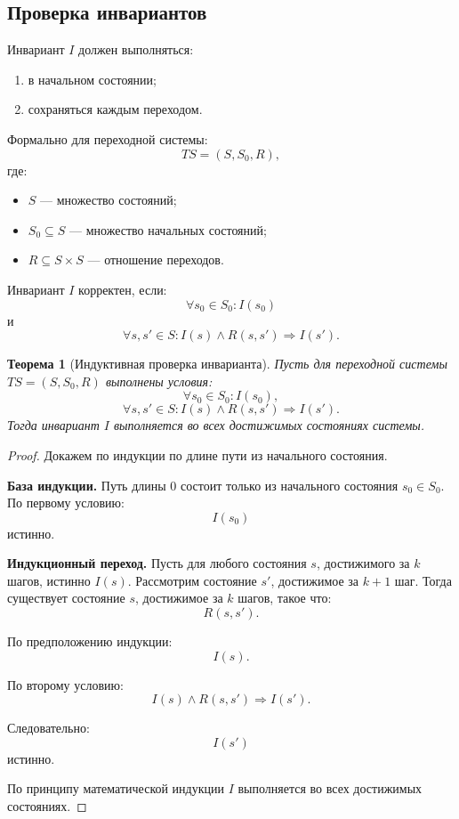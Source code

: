 \documentclass[12pt,a4paper]{article}
\newtheorem{theorem}{Теорема}
\begin{document}
\subsection{Проверка инвариантов}

Инвариант $I$ должен выполняться:
\begin{enumerate}
    \item в начальном состоянии;
    \item сохраняться каждым переходом.
\end{enumerate}

Формально для переходной системы:
\[
    TS = (S, S_0, R),
\]
где:
\begin{itemize}
    \item $S$ --- множество состояний;
    \item $S_0 \subseteq S$ --- множество начальных состояний;
    \item $R \subseteq S \times S$ --- отношение переходов.
\end{itemize}

Инвариант $I$ корректен, если:
\[
    \forall s_0 \in S_0: I(s_0)
\]
и
\[
    \forall s,s' \in S: I(s) \land R(s,s') \Rightarrow I(s').
\]

\begin{theorem}[Индуктивная проверка инварианта]
Пусть для переходной системы $TS=(S,S_0,R)$ выполнены условия:
\[
    \forall s_0 \in S_0: I(s_0),
\]
\[
    \forall s,s' \in S: I(s) \land R(s,s') \Rightarrow I(s').
\]
Тогда инвариант $I$ выполняется во всех достижимых состояниях системы.
\end{theorem}

\begin{proof}
Докажем по индукции по длине пути из начального состояния.

\textbf{База индукции.}
Путь длины $0$ состоит только из начального состояния $s_0 \in S_0$.
По первому условию:
\[
    I(s_0)
\]
истинно.

\textbf{Индукционный переход.}
Пусть для любого состояния $s$, достижимого за $k$ шагов, истинно $I(s)$.
Рассмотрим состояние $s'$, достижимое за $k+1$ шаг.
Тогда существует состояние $s$, достижимое за $k$ шагов, такое что:
\[
    R(s,s').
\]

По предположению индукции:
\[
    I(s).
\]

По второму условию:
\[
    I(s) \land R(s,s') \Rightarrow I(s').
\]

Следовательно:
\[
    I(s')
\]
истинно.

По принципу математической индукции $I$ выполняется во всех достижимых состояниях.
\end{proof}
\end{document}
